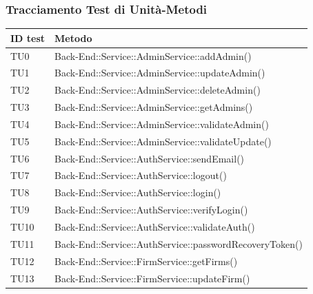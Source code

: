 \documentclass[../PianoDiQualifica_v4.0.0.tex]{subfiles}
\begin{document}
	\subsubsection{Tracciamento Test di Unità-Metodi}
	\begin{longtable}[c] { >{\centering\arraybackslash}p{} >{\centering\arraybackslash}p{}}
		\toprule
		\centerline{\textbf{ID test}} & \centerline{\textbf{Metodo}}  \\
			\midrule
			TU0 & Back-End::Service::AdminService::addAdmin() \\
			\addlinespace[0.3em]
			\midrule
			\addlinespace[0.3em]
			TU1 & Back-End::Service::AdminService::updateAdmin() \\
			\addlinespace[0.3em]
			\midrule
			\addlinespace[0.3em]
			TU2 & Back-End::Service::AdminService::deleteAdmin() \\
			\addlinespace[0.3em]
			\midrule
			\addlinespace[0.3em]
			TU3 & Back-End::Service::AdminService::getAdmins() \\
			\addlinespace[0.3em]
			\midrule
			\addlinespace[0.3em]
			TU4 & Back-End::Service::AdminService::validateAdmin() \\
			\addlinespace[0.3em]
			\midrule
			\addlinespace[0.3em]
			TU5 & Back-End::Service::AdminService::validateUpdate() \\
			\addlinespace[0.3em]
			\midrule
			\addlinespace[0.3em]
			TU6 & Back-End::Service::AuthService::sendEmail() \\
			\addlinespace[0.3em]
			\midrule
			\addlinespace[0.3em]
			TU7 & Back-End::Service::AuthService::logout() \\
			\addlinespace[0.3em]
			\midrule
			\addlinespace[0.3em]
			TU8 & Back-End::Service::AuthService::login() \\
			\addlinespace[0.3em]
			\midrule
			\addlinespace[0.3em]
			TU9 & Back-End::Service::AuthService::verifyLogin() \\
			\addlinespace[0.3em]
			\midrule
			\addlinespace[0.3em]
			TU10 & Back-End::Service::AuthService::validateAuth() \\
			\addlinespace[0.3em]
			\midrule
			\addlinespace[0.3em]
			TU11 & Back-End::Service::AuthService::passwordRecoveryToken() \\
			\addlinespace[0.3em]
			\midrule
			\addlinespace[0.3em]
			TU12 & Back-End::Service::FirmService::getFirms() \\
			\addlinespace[0.3em]
			\midrule
			\addlinespace[0.3em]
			TU13 & Back-End::Service::FirmService::updateFirm() \\

\end{longtable}
\end{document}
